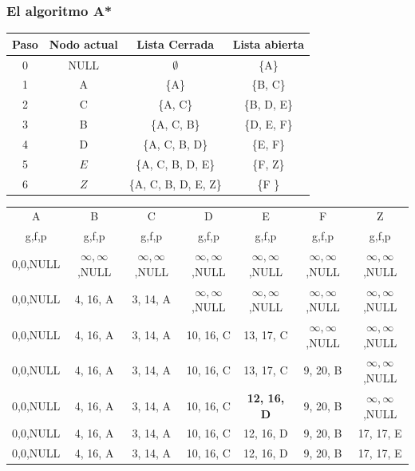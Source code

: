 \documentclass[10pt,spanish,aspectratio=1610]{beamer}
\begin{document}
\begin{frame}\frametitle{El algoritmo A*}
  \begin{table}
    \begin{tabular}{cccc}
      Paso & Nodo actual & Lista Cerrada & Lista abierta\\
      \hline
      0   & NULL & $\emptyset$          & \{A\}      \\
      1   & A    & \{A\}                & \{B, C\}   \\
      2   & C    & \{A, C\}             & \{B, D, E\}\\
      3   & B    & \{A, C, B\}          & \{D, E, F\}\\
      4   & D    & \{A, C, B, D\}       & \{E, F\}   \\
      5   & $E$  & \{A, C, B, D, E\}    & \{F, Z\}   \\
      6   & $Z$  & \{A, C, B, D, E, Z\} & \{F \}     \\
    \end{tabular}
  \end{table}
  \begin{table}
    \footnotesize
    \begin{tabular}{ccccccc}
      A & B & C & D & E & F & Z \\
      g,f,p & g,f,p & g,f,p & g,f,p & g,f,p & g,f,p & g,f,p\\
      \hline
      0,0,NULL & $\infty,\infty$,NULL & $\infty,\infty$,NULL & $\infty,\infty$,NULL & $\infty,\infty$,NULL & $\infty,\infty$,NULL & $\infty,\infty$,NULL\\
      0,0,NULL & 4, 16, A             & 3, 14, A             & $\infty,\infty$,NULL & $\infty,\infty$,NULL & $\infty,\infty$,NULL & $\infty,\infty$,NULL\\
      0,0,NULL & 4, 16, A             & 3, 14, A             & 10, 16, C            & 13, 17, C            & $\infty,\infty$,NULL & $\infty,\infty$,NULL\\
      0,0,NULL & 4, 16, A             & 3, 14, A             & 10, 16, C            & 13, 17, C            & 9, 20, B             & $\infty,\infty$,NULL\\
      0,0,NULL & 4, 16, A             & 3, 14, A             & 10, 16, C            & \textbf{12, 16, D}   & 9, 20, B             & $\infty,\infty$,NULL\\
      0,0,NULL & 4, 16, A             & 3, 14, A             & 10, 16, C            &         12, 16, D    & 9, 20, B             & 17, 17, E           \\
      0,0,NULL & 4, 16, A             & 3, 14, A             & 10, 16, C            &         12, 16, D    & 9, 20, B             & 17, 17, E           \\
    \end{tabular}
  \end{table}
\end{frame}
\end{document}
